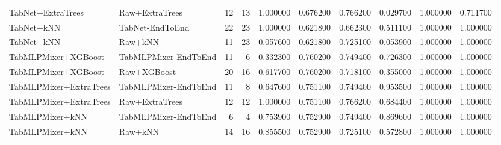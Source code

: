 \begin{table}
\begin{tabular}{llrrrrrrrr}
TabNet+ExtraTrees & Raw+ExtraTrees & 12 & 13 & 1.000000 & 0.676200 & 0.766200 & 0.029700 & 1.000000 & 0.711700 \\
TabNet+kNN & TabNet-EndToEnd & 22 & 23 & 1.000000 & 0.621800 & 0.662300 & 0.511100 & 1.000000 & 1.000000 \\
TabNet+kNN & Raw+kNN & 11 & 23 & 0.057600 & 0.621800 & 0.725100 & 0.053900 & 1.000000 & 1.000000 \\
TabMLPMixer+XGBoost & TabMLPMixer-EndToEnd & 11 & 6 & 0.332300 & 0.760200 & 0.749400 & 0.726300 & 1.000000 & 1.000000 \\
TabMLPMixer+XGBoost & Raw+XGBoost & 20 & 16 & 0.617700 & 0.760200 & 0.718100 & 0.355000 & 1.000000 & 1.000000 \\
TabMLPMixer+ExtraTrees & TabMLPMixer-EndToEnd & 11 & 8 & 0.647600 & 0.751100 & 0.749400 & 0.953500 & 1.000000 & 1.000000 \\
TabMLPMixer+ExtraTrees & Raw+ExtraTrees & 12 & 12 & 1.000000 & 0.751100 & 0.766200 & 0.684400 & 1.000000 & 1.000000 \\
TabMLPMixer+kNN & TabMLPMixer-EndToEnd & 6 & 4 & 0.753900 & 0.752900 & 0.749400 & 0.869600 & 1.000000 & 1.000000 \\
TabMLPMixer+kNN & Raw+kNN & 14 & 16 & 0.855500 & 0.752900 & 0.725100 & 0.572800 & 1.000000 & 1.000000 \\
\bottomrule
\end{tabular}
\end{table}
